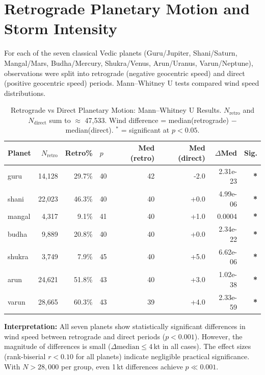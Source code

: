 \documentclass[11pt,a4paper]{article}
\begin{document}
\section{Retrograde Planetary Motion and Storm Intensity}

For each of the seven classical Vedic planets (Guru/Jupiter, Shani/Saturn,
Mangal/Mars, Budha/Mercury, Shukra/Venus, Arun/Uranus, Varun/Neptune),
observations were split into retrograde (negative geocentric speed) and
direct (positive geocentric speed) periods. Mann--Whitney U tests compared
wind speed distributions.

\begin{table}[H]
  \centering
  \caption{Retrograde vs Direct Planetary Motion: Mann--Whitney U Results.
           $N_{\text{retro}}$ and $N_{\text{direct}}$ sum to $\approx$ 47,533.
           Wind difference = median(retrograde) $-$ median(direct).
           ${}^*$ = significant at $p < 0.05$.}
  \label{tab:retro}
  \begin{tabular}{lrrlrrrr}
    \toprule
    Planet & $N_\text{retro}$ & Retro\% & $p$ & Med (retro) & Med (direct) & $\Delta$Med & Sig. \\
    \midrule
  guru & 14,128 & 29.7\% & 40 & 42 & -2.0 & 2.31e-23 & \textbf{*} \\
  shani & 22,023 & 46.3\% & 40 & 40 & +0.0 & 4.99e-06 & \textbf{*} \\
  mangal & 4,317 & 9.1\% & 41 & 40 & +1.0 & 0.0004 & \textbf{*} \\
  budha & 9,889 & 20.8\% & 40 & 40 & +0.0 & 2.34e-22 & \textbf{*} \\
  shukra & 3,749 & 7.9\% & 45 & 40 & +5.0 & 6.62e-06 & \textbf{*} \\
  arun & 24,621 & 51.8\% & 43 & 40 & +3.0 & 1.02e-38 & \textbf{*} \\
  varun & 28,665 & 60.3\% & 43 & 39 & +4.0 & 2.33e-59 & \textbf{*} \\
    \bottomrule
  \end{tabular}
\end{table}

\medskip
\noindent\textbf{Interpretation:}
All seven planets show statistically significant differences in wind speed
between retrograde and direct periods ($p < 0.001$). However, the magnitude
of differences is small ($\Delta\text{median} \leq 4$\,kt in all cases).
The effect sizes (rank-biserial $r < 0.10$ for all planets) indicate negligible
practical significance. With $N > 28{,}000$ per group, even 1\,kt differences
achieve $p \ll 0.001$.
\end{document}
